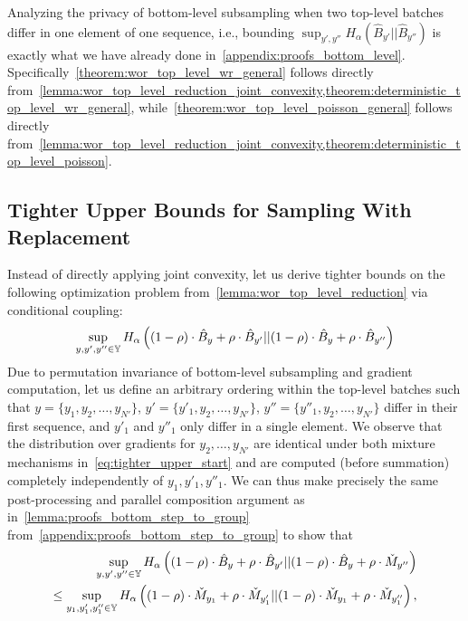 Analyzing the privacy of bottom-level subsampling when two top-level batches differ in one element of one sequence,
i.e., bounding $\sup_{y', y'' }
        H_\alpha\left(\hat{B}_{y'}
            ||
            \hat{B}_{y''}\right)$ is exactly what we have already done in~\cref{appendix:proofs_bottom_level}.
Specifically~\cref{theorem:wor_top_level_wr_general} follows directly from~\cref{lemma:wor_top_level_reduction_joint_convexity,theorem:deterministic_top_level_wr_general}, 
while~\cref{theorem:wor_top_level_poisson_general} follows directly from~\cref{lemma:wor_top_level_reduction_joint_convexity,theorem:deterministic_top_level_poisson}.

\subsection{Tighter Upper Bounds for Sampling With Replacement}
Instead of directly applying joint convexity, let us derive tighter bounds on the following optimization problem from~\cref{lemma:wor_top_level_reduction} via conditional coupling:
\begin{equation}\label{eq:tighter_upper_start}
    \sup_{y, y', y'' \in {\mathbb{Y}}}
        H_\alpha\left((1 - \rho) \cdot \hat{B}_{y} + \rho \cdot \hat{B}_{y'}
            ||
            (1 - \rho) \cdot \hat{B}_{y} + \rho \cdot \hat{B}_{y''}\right)
\end{equation}
Due to permutation invariance of bottom-level subsampling and gradient computation, let us define an arbitrary ordering within the top-level batches such that
$y = \{y_1, y_2,\dots,y_{N'}\}$,
$y' = \{y'_1, y_2,\dots,y_{N'}\}$,
$y'' = \{y''_1, y_2,\dots,y_{N'}\}$ differ in their first sequence, and $y'_1$ and $y''_1$ only differ in a single element.
We observe that the distribution over gradients for $y_2,\dots,y_{N'}$ are identical under both mixture mechanisms in~\cref{eq:tighter_upper_start} and are computed (before summation) completely independently of $y_1,y'_1,y''_1$.
We can thus make precisely the same post-processing and parallel composition argument as in~\cref{lemma:proofs_bottom_step_to_group} from~\cref{appendix:proofs_bottom_step_to_group} to show that
\begin{align}
    \sup_{y, y', y'' \in {\mathbb{Y}}}
        H_\alpha\left((1 - \rho) \cdot \hat{B}_{y} + \rho \cdot \hat{B}_{y'}
            ||
            (1 - \rho) \cdot \hat{B}_{y} + \rho \cdot \check{M}_{y''}\right)
    \\
    \label{eq:tighter_upper_start_relaxed}
    \leq
    \sup_{y_1, y_1', y_1'' \in {\mathbb{Y}}}
        H_\alpha\left((1 - \rho) \cdot \check{M}_{y_1} + \rho \cdot \check{M}_{y_1'}
            ||
            (1 - \rho) \cdot \check{M}_{y_1} + \rho \cdot \check{M}_{y_1''}\right),
\end{align}
